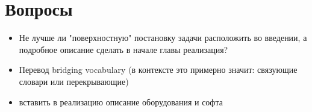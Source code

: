 \documentclass[12pt,a4paper,oneside]{extarticle}
\begin{document}
    \section{Вопросы}
        \begin{itemize}

            \item Не лучше ли "поверхностную" постановку задачи расположить во введении, а подробное описание сделать в начале главы реализация?
            \item Перевод bridging vocabulary (в контексте это примерно значит: связующие словари или перекрывающие)
            \item вставить в реализацию описание оборудования и софта
        \end{itemize}
    \clearpage


    
     \clearpage
    \tableofcontents \clearpage
     \clearpage
     \clearpage
     \clearpage
     \clearpage
     \clearpage
     \clearpage
     \clearpage
     \clearpage
\end{document}
